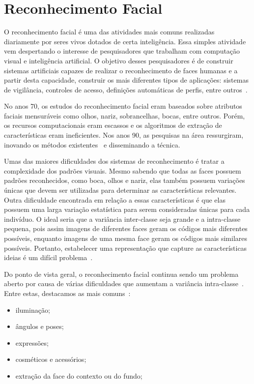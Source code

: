 \section{Reconhecimento Facial}

O reconhecimento facial é uma das atividades mais comuns realizadas diariamente por seres vivos dotados de certa inteligência. Essa simples atividade vem despertando o interesse de pesquisadores que trabalham com computação visual e inteligência artificial. O objetivo desses pesquisadores é de construir sistemas artificiais capazes de realizar o reconhecimento de faces humanas e a partir desta capacidade, construir os mais diferentes tipos de aplicações: sistemas de vigilância, controles de acesso, definições automáticas de perfis, entre outros~\cite{oliveira}.

No anos 70, os estudos do reconhecimento facial eram baseados sobre atributos faciais mensuráveis como olhos, nariz, sobrancelhas, bocas, entre outros. Porém, os recursos computacionais eram escassos e os algoritmos de extração de características eram ineficientes. Nos anos 90, as pesquisas na área ressurgiram, inovando os métodos existentes~\cite{hong, saocarlos} e disseminando a técnica.

Umas das maiores dificuldades dos sistemas de reconhecimento é tratar a complexidade dos padrões visuais. Mesmo sabendo que todas as faces possuem padrões reconhecidos, como boca, olhos e nariz, elas também possuem variações únicas que devem ser utilizadas para determinar as características relevantes. Outra dificuldade encontrada em relação a essas características é que elas possuem uma larga variação estatística para serem consideradas únicas para cada indivíduo. O ideal seria que a variância inter-classe seja grande e a intra-classe pequena, pois assim imagens de diferentes faces geram os códigos mais diferentes possíveis, enquanto imagens de uma mesma face geram os códigos mais similares possíveis. Portanto, estabelecer uma representação que capture as características ideias é um difícil problema~\cite{saocarlos}.

Do ponto de vista geral, o reconhecimento facial continua sendo um problema aberto por causa de várias dificuldades que aumentam a variância intra-classe~\cite{hong}. Entre estas, destacamos as mais comuns~\cite{saocarlos}:

	\begin{itemize}
		\item iluminação;
		\item ângulos e poses;
		\item expressões;
		\item cosméticos e acessórios;
		\item extração da face do contexto ou do fundo;
	\end{itemize}

